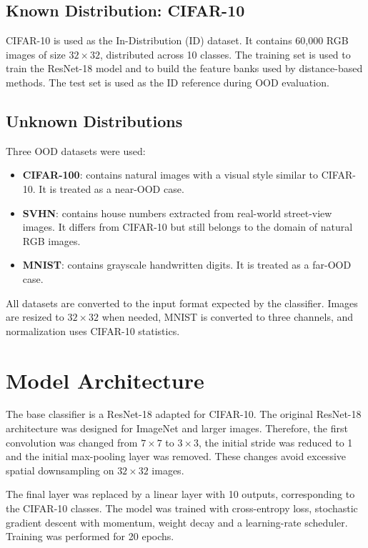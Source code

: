 \documentclass[11pt,a4paper]{article}
\begin{document}
\subsection{Known Distribution: CIFAR-10}

CIFAR-10 is used as the In-Distribution (ID) dataset.
It contains 60,000 RGB images of size $32 \times 32$, distributed across 10 classes.
The training set is used to train the ResNet-18 model and to build the feature banks used by distance-based methods.
The test set is used as the ID reference during OOD evaluation.

\subsection{Unknown Distributions}

Three OOD datasets were used:

\begin{itemize}
    \item \textbf{CIFAR-100}: contains natural images with a visual style similar to CIFAR-10. It is treated as a near-OOD case.
    \item \textbf{SVHN}: contains house numbers extracted from real-world street-view images. It differs from CIFAR-10 but still belongs to the domain of natural RGB images.
    \item \textbf{MNIST}: contains grayscale handwritten digits. It is treated as a far-OOD case.
\end{itemize}

All datasets are converted to the input format expected by the classifier.
Images are resized to $32 \times 32$ when needed, MNIST is converted to three channels, and normalization uses CIFAR-10 statistics.

\section{Model Architecture}

The base classifier is a ResNet-18 adapted for CIFAR-10.
The original ResNet-18 architecture was designed for ImageNet and larger images.
Therefore, the first convolution was changed from $7 \times 7$ to $3 \times 3$, the initial stride was reduced to 1 and the initial max-pooling layer was removed.
These changes avoid excessive spatial downsampling on $32 \times 32$ images.

The final layer was replaced by a linear layer with 10 outputs, corresponding to the CIFAR-10 classes.
The model was trained with cross-entropy loss, stochastic gradient descent with momentum, weight decay and a learning-rate scheduler.
Training was performed for 20 epochs.
\end{document}
